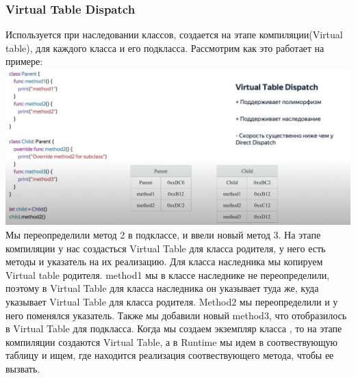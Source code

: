 \documentclass{article}
\begin{document}
    \subsubsection{Virtual Table Dispatch}
    Используется при наследовании классов, создается на этапе компиляции(Virtual table), для каждого класса и его подкласса. 
    \newline
    Рассмотрим как это работает на примере: 
    \newline
    \includegraphics[scale = 0.2]{pic/Снимок экрана 2023-07-28 в 19.16.57.png}
    \newline
    Мы переопределили метод 2 в подклассе, и ввели новый метод 3. На этапе компиляции у нас создасться Virtual Table для класса родителя, у него есть методы и указатель на их реализацию.
    \newline
    Для класса наследника мы копируем Virtual table родителя. method1 мы в классе наследнике не переопределили, поэтому в Virtual Table для класса наследника он указывает туда же, куда указывает Virtual Table для класса родителя. Method2 мы переопределили и у него поменялся указатель. Также мы добавили новый method3, что отобразилось в Virtual Table для подкласса. 
    \newline
    Когда мы создаем экземпляр класса , то на этапе компиляции создаются Virtual Table, а в Runtime мы идем в соотвествующую таблицу и ищем, где находится реализация соотвествующего метода, чтобы ее вызвать. 
\end{document}
